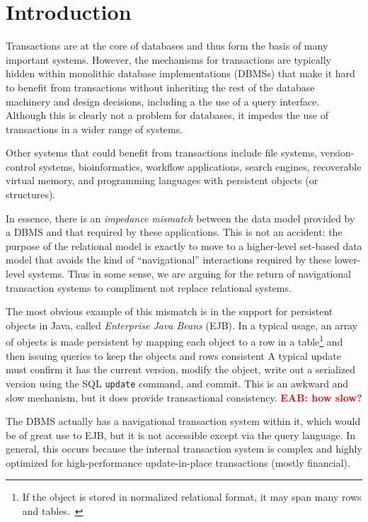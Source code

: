 \documentclass[letterpaper,twocolumn,english]{article}
\newcommand{\eab}[1]{\textcolor{red}{\bf EAB: #1}}
\begin{document}
\section{Introduction}

Transactions are at the core of databases and thus form the basis of many
important systems. However, the mechanisms for transactions are
typically hidden within monolithic database implementations (DBMSs) that make
it hard to benefit from transactions without inheriting the rest of
the database machinery and design decisions, including a the use of a
query interface.  Although this is clearly not a problem for
databases, it impedes the use of transactions in a wider range of
systems.

Other systems that could benefit from transactions include file
systems, version-control systems, bioinformatics, workflow
applications, search engines, recoverable virtual memory, and
programming languages with persistent objects (or structures).

In essence, there is an {\em impedance mismatch} between the data
model provided by a DBMS and that required by these applications. This is
not an accident: the purpose of the relational model is exactly to
move to a higher-level set-based data model that avoids the kind of
``navigational'' interactions required by these lower-level systems.
Thus in some sense, we are arguing for the return of navigational
transaction systems to compliment not replace relational systems.

The most obvious example of this mismatch is in the support for
persistent objects in Java, called {\em Enterprise Java Beans}
(EJB). In a typical usage, an array of objects is made persistent by
mapping each object to a row in a table\footnote{If the object is
stored in normalized relational format, it may span many rows and tables.~\cite{Hibernate}} 
and then issuing queries to
keep the objects and rows consistent  A typical update must confirm
it has the current version, modify the object, write out a serialized
version using the SQL {\tt update} command, and commit.  This is an
awkward and slow mechanism, but it does provide transactional
consistency. \eab{how slow?}

The DBMS actually has a navigational transaction system within it,
which would be of great use to EJB, but it is not accessible except
via the query language.  In general, this occurs because the internal
transaction system is complex and highly optimized for
high-performance update-in-place transactions (mostly financial).
\end{document}
